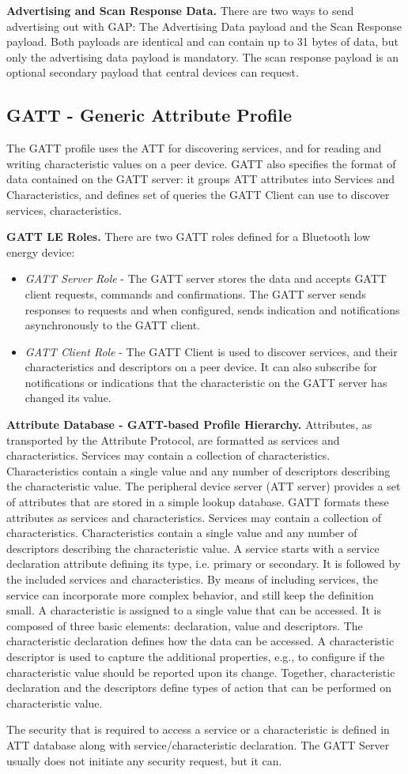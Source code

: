 \textbf{Advertising and Scan Response Data.}
There are two ways to send advertising out with GAP: The Advertising Data payload and the Scan Response payload. Both payloads are identical and can contain up to 31 bytes of data, but only the advertising data payload is mandatory. The scan response payload is an optional secondary payload that central devices can request.

\subsection{GATT - Generic Attribute Profile}
The GATT profile uses the ATT for discovering services, and for reading and writing characteristic values on a peer device. GATT also specifies the format of data contained on the GATT server: it groups ATT attributes into Services and Characteristics, and defines set of queries the GATT Client can use to discover services, characteristics.

\textbf{GATT LE Roles.}
There are two GATT roles defined for a Bluetooth low energy device:
\begin{itemize}
\item \emph{GATT Server Role} - The GATT server stores the data and accepts GATT client requests, commands and confirmations. The GATT server sends responses to requests and when configured, sends indication and notifications asynchronously to the GATT client. 
\item \emph{GATT Client Role} - The GATT Client is used to discover services, and their characteristics and descriptors on a peer device. It can also subscribe for notifications or indications that the characteristic on the GATT server has changed its value. 
\end{itemize}

\textbf{Attribute Database - GATT-based Profile Hierarchy.}
Attributes, as transported by the Attribute Protocol, are formatted as services and characteristics. Services may contain a collection of characteristics. Characteristics contain a single value and any number of descriptors describing the characteristic value. The peripheral device server (ATT server) provides a set of attributes that are stored in a simple lookup database. GATT formats these attributes as services and characteristics. Services may contain a collection of characteristics. Characteristics contain a single value and any number of descriptors describing the characteristic value. A service starts with a service declaration attribute defining its type, i.e. primary or secondary. It is followed by the included services and characteristics. By means of including services, the service can incorporate more complex behavior, and still keep the definition small. A characteristic is assigned to a single value that can be accessed. It is composed of three basic elements: declaration, value and descriptors. The characteristic declaration defines how the data can be accessed. A characteristic descriptor is used to capture the additional properties, e.g., to configure if the characteristic value should be reported upon its change. Together, characteristic declaration and the descriptors define types of action that can be performed on characteristic value.

The security that is required to access a service or a characteristic is defined in ATT database along with service/characteristic declaration. The GATT Server usually does not initiate any security request, but it can. 


